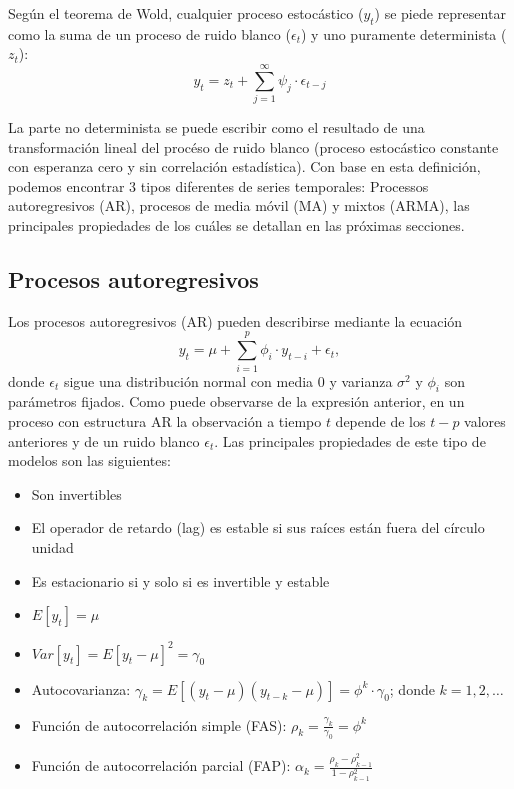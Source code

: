 \documentclass[12pt,twoside]{article} %
\begin{document}
Según el teorema de Wold, cualquier proceso estocástico ($y_t$) se piede representar como la suma de un proceso de ruido blanco ($\epsilon_t$) y uno puramente determinista ($z_t$):
\begin{equation}
 y_t = z_t + \sum_{j=1}^{\infty} \psi_j \cdot \epsilon_{t-j}
\end{equation}

La parte no determinista se puede escribir como el resultado de una transformación lineal del procéso de ruido blanco (proceso estocástico constante con esperanza cero y sin correlación estadística). Con base en esta definición, podemos encontrar 3 tipos diferentes de series temporales: Processos autoregresivos (AR), procesos de media móvil (MA) y mixtos (ARMA), las principales propiedades de los cuáles se detallan en las próximas secciones.

\subsection{Procesos autoregresivos}
Los procesos autoregresivos (AR) pueden describirse mediante la ecuación
\begin{equation}
y_t = \mu + \sum_{i=1}^p \phi_i \cdot y_{t-i} + \epsilon_t,
\end{equation}
donde $\epsilon_t$ sigue una distribución normal con media 0 y varianza $\sigma^2$ y $\phi_i$ son parámetros fijados. Como puede observarse de la expresión anterior, en un proceso con estructura AR la observación a tiempo $t$ depende de los $t-p$ valores anteriores y de un ruido blanco $\epsilon_t$. Las principales propiedades de este tipo de modelos son las siguientes:
\begin{itemize}
 \item Son invertibles
 \item El operador de retardo (lag) es estable si sus raíces están fuera del círculo unidad
 \item Es estacionario si y solo si es invertible y estable
 \item $E[y_t]=\mu$
 \item $Var[y_t]=E[y_t-\mu]^2=\gamma_0$
 \item Autocovarianza: $\gamma_k=E[(y_t-\mu)(y_{t-k}-\mu)]=\phi^k \cdot \gamma_0$; donde $k=1,2, \ldots$
 \item Función de autocorrelación simple (FAS): $\rho_k=\frac{\gamma_k}{\gamma_0}=\phi^k$
 \item Función de autocorrelación parcial (FAP): $\alpha_k=\frac{\rho_k-\rho_{k-1}^2}{1-\rho_{k-1}^2}$
\end{itemize}
\end{document}
